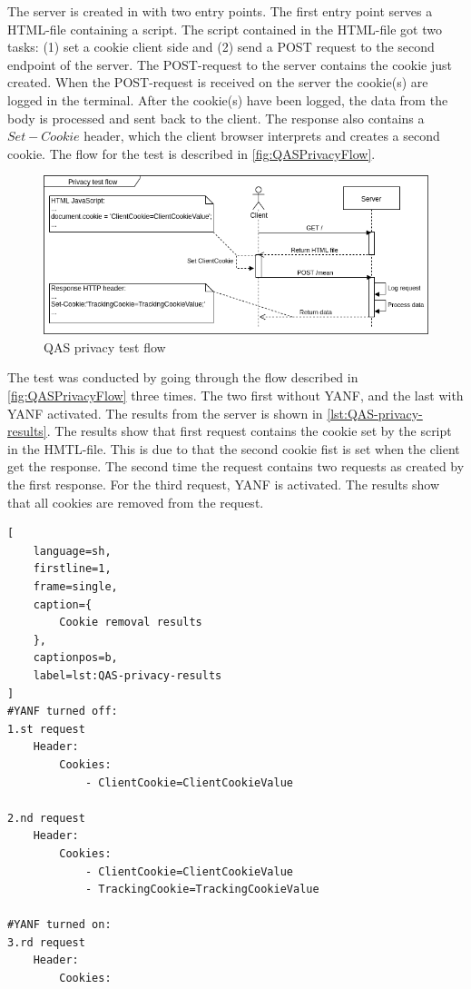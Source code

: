 \documentclass[main.tex]{subfiles}
\begin{document}
The server is created in with two entry points. The first entry point serves a HTML-file containing a script. The script contained in the HTML-file got two tasks: (1) set a cookie client side and (2) send a POST request to the second endpoint of the server. The POST-request to the server contains the cookie just created. When the POST-request is received on the server the cookie(s) are logged in the terminal. After the cookie(s) have been logged, the data from the body is processed and sent back to the client. The response also contains a \(Set-Cookie\) header, which the client browser interprets and creates a second cookie. The flow for the test is described in \autoref{fig:QASPrivacyFlow}.

\begin{figure}[h]
    \centering
    \includegraphics{Images/QAS-Test/QASPrivacyFlow.png}
    \caption{QAS privacy test flow}
    \label{fig:QASPrivacyFlow}
\end{figure}

The test was conducted by going through the flow described in \autoref{fig:QASPrivacyFlow} three times. The two first without YANF, and the last with YANF activated. The results from the server is shown in \autoref{lst:QAS-privacy-results}. The results show that first request contains the cookie set by the script in the HMTL-file. This is due to that the second cookie fist is set when the client get the response. The second time the request contains two requests as created by the first response. For the third request, YANF is activated. The results show that all cookies are removed from the request.

\begin{lstlisting}[
    language=sh,
    firstline=1, 
    frame=single, 
    caption={
        Cookie removal results
    },
    captionpos=b,
    label=lst:QAS-privacy-results
]
#YANF turned off:
1.st request
    Header:
        Cookies:
            - ClientCookie=ClientCookieValue

2.nd request
    Header:
        Cookies: 
            - ClientCookie=ClientCookieValue
            - TrackingCookie=TrackingCookieValue

#YANF turned on:
3.rd request
    Header:
        Cookies: 
\end{lstlisting}
\end{document}

